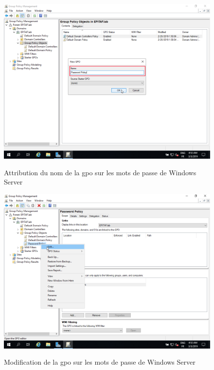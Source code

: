 \begin{figure}[h!]
	\begin{center}
		\caption{Attribution du nom de la gpo sur les mots de passe de Windows Server}
		\includegraphics[scale=0.5]{WS_Screenshots/gpo_2.png}
		\label{WS_Screenshots/gpo_2}
	\end{center}
\end{figure}
\FloatBarrier 
    

\begin{figure}[h!]
	\begin{center}
		\caption{Modification de la gpo sur les mots de passe de Windows Server}
		\includegraphics[scale=0.5]{WS_Screenshots/gpo_3.png}
		\label{WS_Screenshots/gpo_3}
	\end{center}
\end{figure}
\FloatBarrier 
    

